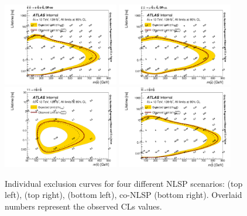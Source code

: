 \begin{figure}[!ht]
    \centering
        \includegraphics[width=0.45\textwidth]{figures/limits/SlepSlep_SRee_clsobs_ps-eps-converted-to.pdf}
        \includegraphics[width=0.45\textwidth]{figures/limits/SlepSlep_SRmm_clsobs_ps-eps-converted-to.pdf}
        \includegraphics[width=0.45\textwidth]{figures/limits/Stau_clsobs_ps-eps-converted-to.pdf}
        \includegraphics[width=0.45\textwidth]{figures/limits/Comb_clsobs_ps-eps-converted-to.pdf}
    \caption{Individual exclusion curves for four different \ac{NLSP} scenarios: \selec (top left), \smu (top right), \stau (bottom left), co-\ac{NLSP} (bottom right). Overlaid numbers represent the observed CLs values.}
    \label{fig:plot_cls}
\end{figure}

